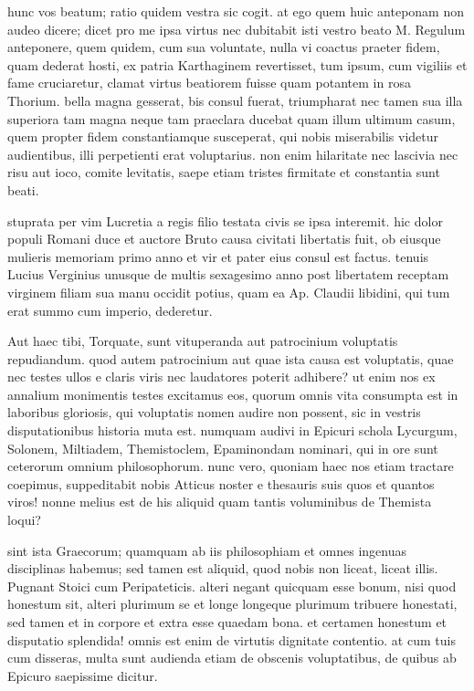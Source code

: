  hunc vos beatum; ratio quidem vestra sic cogit. at ego quem huic anteponam non audeo dicere; dicet pro me ipsa virtus nec dubitabit isti vestro beato M. Regulum anteponere, quem quidem, cum sua voluntate, nulla vi coactus praeter fidem, quam dederat hosti, ex patria Karthaginem revertisset, tum ipsum, cum vigiliis et fame cruciaretur, clamat virtus beatiorem fuisse quam potantem in rosa Thorium. bella magna gesserat, bis consul fuerat, triumpharat nec tamen sua illa superiora tam magna neque tam praeclara ducebat quam illum ultimum casum, quem propter fidem constantiamque susceperat, qui nobis miserabilis videtur audientibus, illi perpetienti erat voluptarius. non enim hilaritate nec lascivia nec risu aut ioco, comite levitatis, saepe etiam tristes firmitate et constantia sunt beati.

 stuprata per vim Lucretia a regis filio testata civis se ipsa interemit. hic dolor populi Romani duce et auctore Bruto causa civitati libertatis fuit, ob eiusque mulieris memoriam primo anno et vir et pater eius consul est factus. tenuis Lucius Verginius unusque de multis sexagesimo anno post libertatem receptam virginem filiam sua manu occidit potius, quam ea Ap. Claudii libidini, qui tum erat summo cum imperio, dederetur.

 Aut haec tibi, Torquate, sunt vituperanda aut patrocinium voluptatis repudiandum. quod autem patrocinium aut quae ista causa est voluptatis, quae nec testes ullos e claris viris nec laudatores poterit adhibere? ut enim nos ex annalium monimentis testes excitamus eos, quorum omnis vita consumpta est in laboribus gloriosis, qui voluptatis nomen audire non possent, sic in vestris disputationibus historia muta est. numquam audivi in Epicuri schola Lycurgum, Solonem, Miltiadem, Themistoclem, Epaminondam nominari, qui in ore sunt ceterorum omnium philosophorum. nunc vero, quoniam haec nos etiam tractare coepimus, suppeditabit nobis Atticus noster e thesauris suis quos et quantos viros! nonne melius est de his aliquid quam tantis voluminibus de Themista loqui?

 sint ista Graecorum; quamquam ab iis philosophiam et omnes ingenuas disciplinas habemus; sed tamen est aliquid, quod nobis non liceat, liceat illis. Pugnant Stoici cum Peripateticis. alteri negant quicquam esse bonum, nisi quod honestum sit, alteri plurimum se et longe longeque plurimum tribuere honestati, sed tamen et in corpore et extra esse quaedam bona. et certamen honestum et disputatio splendida! omnis est enim de virtutis dignitate contentio. at cum tuis cum disseras, multa sunt audienda etiam de obscenis voluptatibus, de quibus ab Epicuro saepissime dicitur.

